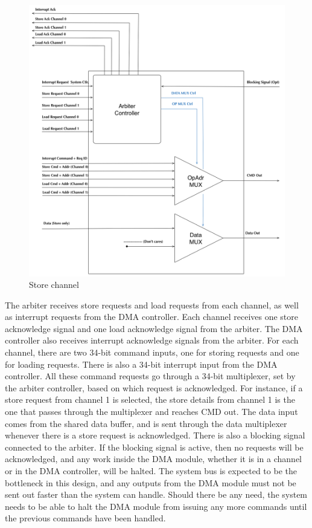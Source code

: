 \begin{appendix}
\begin{figure}[htb]
    \centering
    \includegraphics[width=1.0\textwidth]{Figures/DMA/Arbiter}
    \caption{Store channel}
    \label{fig:arbiter}
\end{figure}

The arbiter receives store requests and load requests from each channel, as well as interrupt requests from the DMA controller.
Each channel receives one store acknowledge signal and one load acknowledge signal from the arbiter.
The DMA controller also receives interrupt acknowledge signals from the arbiter.
For each channel, there are two 34-bit command inputs, one for storing requests and one for loading requests.
There is also a 34-bit interrupt input from the DMA controller.
All these command requests go through a 34-bit multiplexer, set by the arbiter controller, based on which request is acknowledged.
For instance, if a store request from channel 1 is selected, the store details from channel 1 is the one that passes through the multiplexer and reaches CMD out.
The data input comes from the shared data buffer, and is sent through the data multiplexer whenever there is a store request is acknowledged.
There is also a blocking signal connected to the arbiter.
If the blocking signal is active, then no requests will be acknowledged, and any work inside the DMA module, whether it is in a channel or in the DMA controller, will be halted.
The system bus is expected to be the bottleneck in this design, and any outputs from the DMA module must not be sent out faster than the system can handle.
Should there be any need, the system needs to be able to halt the DMA module from issuing any more commands until the previous commands have been handled. 


\end{appendix}
